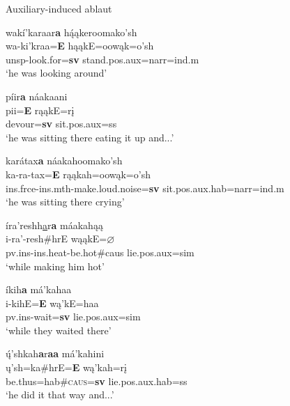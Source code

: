 \begin{exe}
\item\label{auxablaut} Auxiliary-induced ablaut

	\begin{xlist}

	\item\label{auxablaut1}
	\glll wakí'karaar\textbf{a} hą́ąkeroomako'sh\\
	wa-ki'kraa=\textbf{E} hąąkE=oowąk=o'sh\\
	unsp-\textnormal{look.for}=\textbf{sv} \textnormal{stand}.pos.aux=narr=ind.m\\
	\glt `he was looking around' \citep[139]{hollow1973a}

	\item\label{auxablaut2}
	\glll 	píir\textbf{a} náakaani\\
	pii=\textbf{E} rąąkE=rį\\
	\textnormal{devour}=\textbf{sv} \textnormal{sit}.pos.aux=ss\\

	\glt `he was sitting there eating it up and...' \citep[122]{hollow1973b}

	\item\label{auxablaut3}
	\glll 	karátax\textbf{a} náakahoomako'sh\\
	ka-ra-tax=\textbf{E} rąąkah=oowąk=o'sh\\
	ins.frce-ins.mth-\textnormal{make.loud.noise}=\textbf{sv} \textnormal{sit}.pos.aux.hab=narr=ind.m\\
	\glt  `he was sitting there crying' \citep[222]{hollow1973b}

	\item\label{auxablaut4}
	\glll 	íra'reshh\uline{a}r\textbf{a} máakahąą\\
	i-ra'-resh\#hrE wąąkE=$\varnothing$\\
	pv.ins-ins.heat-\textnormal{be.hot}\#caus \textnormal{lie}.pos.aux=sim\\
	\glt `while making him hot' \citep[204]{hollow1973b}

	\item\label{auxablaut5}
	\glll íkih\textbf{a} má'kahaa\\
	i-kihE=\textbf{E} wą'kE=haa\\
	pv.ins-\textnormal{wait}=\textbf{sv} \textnormal{lie}.pos.aux=sim\\
	\glt `while they waited there' \citep[298]{hollow1973b}

	\item\label{auxablaut6}
	\glll  ų́'shkah\textbf{a}r\textbf{aa} má'kahini\\
	ų'sh=ka\#hrE=\textbf{E} wą'kah=rį\\
	\textnormal{be.thus}={hab}\#\textsc{caus}=\textbf{sv} \textnormal{lie}.{pos.aux.hab=ss}\\
	\glt `he did it that way and...' \citep[224]{hollow1973b}


\end{xlist}
\end{exe}
